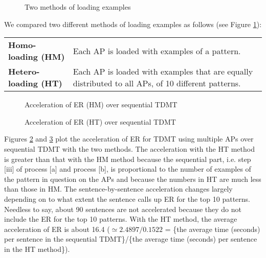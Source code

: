 \begin{figure}[t]
  \begin{center}
    \caption{Two methods of loading examples}
    \label{fig:fig-storing-method-e}
  \end{center}
\end{figure}

We compared two different methods of loading examples
as follows (see Figure \ref{fig:fig-storing-method-e}):

\begin{center}
  \tabcolsep=0mm
  \begin{tabular}{l@{\quad}p{97mm}}
    {\bf Homo-loading (HM)} & Each AP is loaded with examples of a pattern.\\
    {\bf Hetero-loading (HT)} & Each AP is loaded with examples
    that are equally distributed to all APs, of 10 different patterns.
  \end{tabular}
\end{center}

\begin{figure}[htb]
  \begin{center}
    \caption{Acceleration of ER (HM) over sequential TDMT}
    \label{fig:speedup-histo-er-hm}
  \end{center}
\end{figure}

\begin{figure}[htb]
  \begin{center}
    \caption{Acceleration of ER (HT) over sequential TDMT}
    \label{fig:speedup-histo-er-ht}
  \end{center}
\end{figure}

Figures \ref{fig:speedup-histo-er-hm} and \ref{fig:speedup-histo-er-ht} plot
the acceleration of ER
for TDMT using multiple APs over sequential TDMT with the two
methods. 
The acceleration with the HT method is greater
than that with the HM method because the sequential part, 
i.e.  step [iii] of process [a] and process [b],
is proportional to the number of examples of the pattern in question
on the APs
and because the numbers in 
HT are much less than those in HM.
The  sentence-by-sentence acceleration changes largely depending on  to 
what extent the sentence calls up ER for the top 10 patterns.
Needless to say, about 90 sentences are not accelerated
because they do not include
the ER for the top 10 patterns.
 With the HT method, the average acceleration of ER 
is about 16.4 ($\simeq
2.4897/0.1522$ = \{the average time (seconds) per sentence in the sequential
TDMT\}/\{the average time  (seconds) per sentence in the HT method\}).

